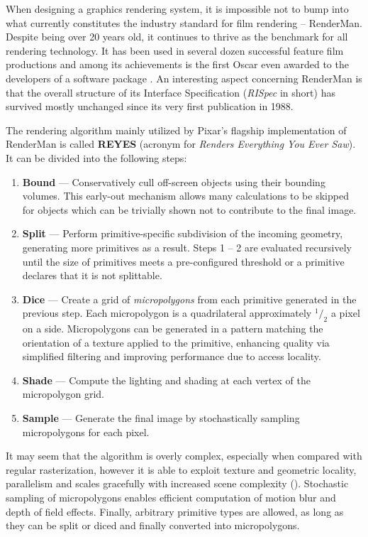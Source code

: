 
When designing a graphics rendering system, it is impossible not to bump into what currently constitutes the industry standard for film rendering -- RenderMan. Despite being over 20 years old, it continues to thrive as the benchmark for all rendering technology. It has been used in several dozen successful feature film productions and among its achievements is the first Oscar even awarded to the developers of a software package \cite{RenderManAwards}. An interesting aspect concerning RenderMan is that the overall structure of its Interface Specification (\emph{RISpec} in short) has survived mostly unchanged since its very first publication in 1988.

The rendering algorithm mainly utilized by Pixar's flagship implementation of RenderMan is called \textbf{REYES} (acronym for \emph{Renders Everything You Ever Saw}). It can be divided into the following steps:
	
\begin{enumerate}
\item \textbf{Bound} --- Conservatively cull off-screen objects using their bounding volumes. This early-out mechanism allows many calculations to be skipped for objects which can be trivially shown not to contribute to the final image.
\item \textbf{Split} --- Perform primitive-specific subdivision of the incoming geometry, generating more primitives as a result. Steps 1 -- 2 are evaluated recursively until the size of primitives meets a pre-configured threshold or a primitive declares that it is not splittable.
\item \textbf{Dice} --- Create a grid of \emph{micropolygons} from each primitive generated in the previous step. Each micropolygon is a quadrilateral approximately $^1/_2$ a pixel on a side. Micropolygons can be generated in a pattern matching the orientation of a texture applied to the primitive, enhancing quality via simplified filtering and improving performance due to access locality.
\item \textbf{Shade} --- Compute the lighting and shading at each vertex of the micropolygon grid.
\item \textbf{Sample} --- Generate the final image by stochastically sampling micropolygons for each pixel.
\end{enumerate}

It may seem that the algorithm is overly complex, especially when compared with regular rasterization, however it is able to exploit texture and geometric locality, parallelism and scales gracefully with increased scene complexity (\cite{Cook87reyes}). Stochastic sampling of micropolygons enables efficient computation of motion blur and depth of field effects. Finally, arbitrary primitive types are allowed, as long as they can be split or diced and finally converted into micropolygons.


